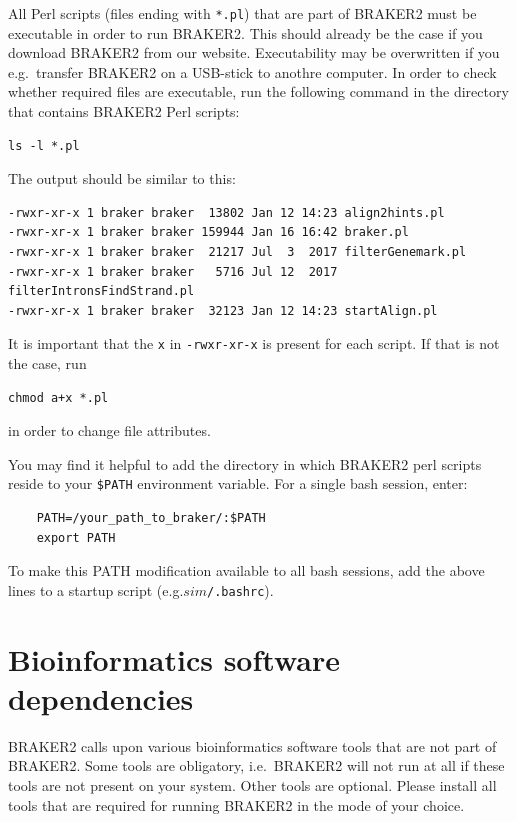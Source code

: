 \documentclass[a4paper,10pt]{report}
\begin{document}
All Perl scripts (files ending with \texttt{*.pl}) that are part of BRAKER2 must be executable in order to run BRAKER2. This should already be the case if you download BRAKER2 from our website. Executability may be overwritten if you e.g.~transfer BRAKER2 on a USB-stick to anothre computer. In order to check whether required files are executable, run the following command in the directory that contains BRAKER2 Perl scripts:

\begin{verbatim}
ls -l *.pl
\end{verbatim}

The output should be similar to this:

\begin{verbatim}
-rwxr-xr-x 1 braker braker  13802 Jan 12 14:23 align2hints.pl
-rwxr-xr-x 1 braker braker 159944 Jan 16 16:42 braker.pl
-rwxr-xr-x 1 braker braker  21217 Jul  3  2017 filterGenemark.pl
-rwxr-xr-x 1 braker braker   5716 Jul 12  2017 filterIntronsFindStrand.pl
-rwxr-xr-x 1 braker braker  32123 Jan 12 14:23 startAlign.pl
\end{verbatim}

It is important that the \texttt{x} in \texttt{-rwxr-xr-x} is present for each script. If that is not the case, run

\begin{verbatim}
chmod a+x *.pl
\end{verbatim}

in order to change file attributes.

You may find it helpful to add the directory in which BRAKER2 perl scripts reside to 
    your \texttt{\$PATH} environment variable. For a single bash session, enter:

    \begin{verbatim}
    PATH=/your_path_to_braker/:$PATH
    export PATH
    \end{verbatim}
    
To make this PATH modification available to all bash sessions, add the above lines to a startup script (e.g.\texttt{$sim$/.bashrc}).

\section{Bioinformatics software dependencies}

BRAKER2 calls upon various bioinformatics software tools that are not part of BRAKER2. Some tools are obligatory, i.e.~BRAKER2 will not run at all if these tools are not present on your system. Other tools are optional. Please install all tools that are required for running BRAKER2 in the mode of your choice.
\end{document}
